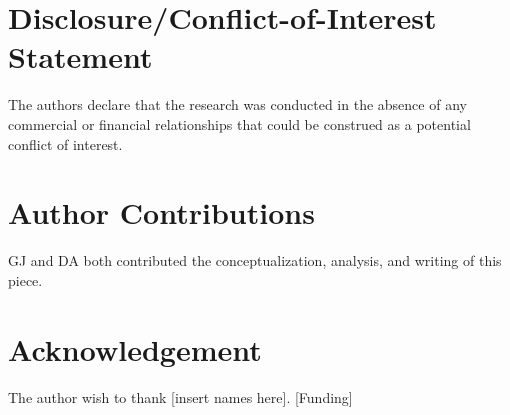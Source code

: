 \documentclass[fleqn,10pt]{wlpeerj_noabs}
\begin{document}
\section*{Disclosure/Conflict-of-Interest Statement}

The authors declare that the research was conducted in the absence of any commercial or financial relationships that could be construed as a potential conflict of interest.

\section*{Author Contributions}

GJ and DA both contributed the conceptualization, analysis, and writing of this piece.

\section*{Acknowledgement}
The author wish to thank [insert names here]. [Funding]


\end{document}
